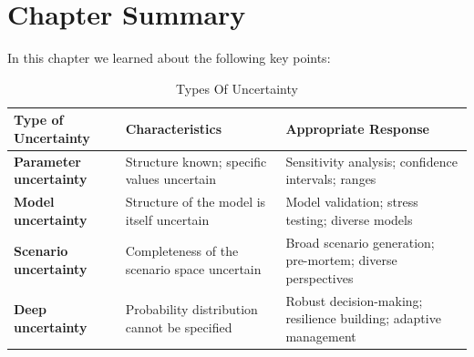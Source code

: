 \newpage
\section{Chapter Summary}
In this chapter we learned about the following key points:

\begin{table}[H]
  \centering
  \renewcommand{\arraystretch}{1.5}
  \begin{tabularx}{\textwidth}{ | >{\raggedright\arraybackslash}p{} 
								| >{\raggedright\arraybackslash}p{} 
                                | >{\raggedright\arraybackslash}X | }
    \hline
    \textbf{Type of Uncertainty} & \textbf{Characteristics} & \textbf{Appropriate Response} \\
    \hline
    \textbf{Parameter uncertainty} & Structure known; specific values uncertain & Sensitivity analysis; confidence intervals; ranges\\
    \hline
    \textbf{Model uncertainty} & Structure of the model is itself uncertain & Model validation; stress testing; diverse models\\
    \hline
    \textbf{Scenario uncertainty} & Completeness of the scenario space uncertain & Broad scenario generation; pre-mortem; diverse perspectives\\
    \hline
    \textbf{Deep uncertainty} & Probability distribution cannot be specified & Robust decision-making; resilience building; adaptive management\\
    \hline
  \end{tabularx}
  \caption{Types Of Uncertainty}
\end{table}

